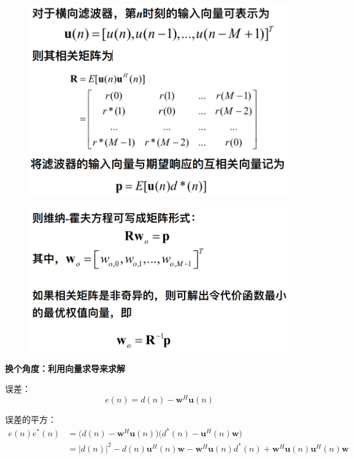 \documentclass[UTF8]{ctexart} %
\begin{document}
			\begin{figure}[H]
				\centering\includegraphics[scale=0.25]{16.png}
			\end{figure}
			\begin{figure}[H]
				\centering\includegraphics[scale=0.25]{17.png}
			\end{figure}
			
			\textbf{换个角度：利用向量求导来求解}
			
			误差：
			\[e(n) = d(n)-\textbf{w}^H\textbf{u}(n)\]
			
			误差的平方：
			\[\begin{aligned}
			e(n)e^*(n) &= \Big(d(n)-\textbf{w}^H\textbf{u}(n)\Big) \Big(d^*(n)-\textbf{u}^H(n)\textbf{w}\Big)\\
			&=|d(n)|^2 -d(n)\textbf{u}^H(n)\textbf{w}-\textbf{w}^H\textbf{u}(n)d^*(n) + \textbf{w}^H\textbf{u}(n)\textbf{u}^H(n)\textbf{w}
			\end{aligned}	
			\]
			
\end{document}
